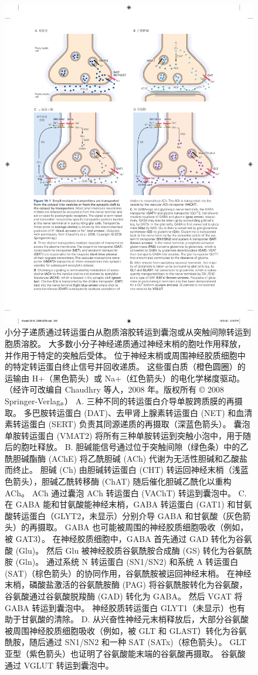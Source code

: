 \begin{figure}[htbp]
	\centering
	\includegraphics[width=0.95\linewidth]{chap16/fig_16_1}
	\caption{小分子递质通过转运蛋白从胞质溶胶转运到囊泡或从突触间隙转运到胞质溶胶。 大多数小分子神经递质通过神经末梢的胞吐作用释放，并作用于特定的突触后受体。 位于神经末梢或周围神经胶质细胞中的特定转运蛋白终止信号并回收递质。 这些蛋白质（橙色圆圈）的运输由 H+（黑色箭头）或 Na+（红色箭头）的电化学梯度驱动。 （经许可改编自 Chaudhry 等人，2008 年。版权所有 © 2008 Springer-Verlag。） A. 三种不同的转运蛋白介导单胺跨质膜的再摄取。 多巴胺转运蛋白 (DAT)、去甲肾上腺素转运蛋白 (NET) 和血清素转运蛋白 (SERT) 负责其同源递质的再摄取（深蓝色箭头）。 囊泡单胺转运蛋白 (VMAT2) 将所有三种单胺转运到突触小泡中，用于随后的胞吐释放。 B. 胆碱能信号通过位于突触间隙（绿色条）中的乙酰胆碱酯酶 (AChE) 将乙酰胆碱 (ACh) 代谢为无活性胆碱和乙酸盐而终止。 胆碱 (Ch) 由胆碱转运蛋白 (CHT) 转运回神经末梢（浅蓝色箭头），胆碱乙酰转移酶 (ChAT) 随后催化胆碱乙酰化以重构 ACh。 ACh 通过囊泡 ACh 转运蛋白 (VAChT) 转运到囊泡中。 C. 在 GABA 能和甘氨酸能神经末梢，GABA 转运蛋白 (GAT1) 和甘氨酸转运蛋白（GLYT2，未显示）分别介导 GABA 和甘氨酸（灰色箭头）的再摄取。 GABA 也可能被周围的神经胶质细胞吸收（例如，被 GAT3）。 在神经胶质细胞中，GABA 首先通过 GAD 转化为谷氨酸 (Glu)。 然后 Glu 被神经胶质谷氨酰胺合成酶 (GS) 转化为谷氨酰胺 (Gln)。 通过系统 N 转运蛋白 (SN1/SN2) 和系统 A 转运蛋白 (SAT)（棕色箭头）的协同作用，谷氨酰胺被运回神经末梢。 在神经末梢，磷酸盐激活的谷氨酰胺酶 (PAG) 将谷氨酰胺转化为谷氨酸，谷氨酸通过谷氨酸脱羧酶 (GAD) 转化为 GABA。 然后 VGAT 将 GABA 转运到囊泡中。 神经胶质转运蛋白 GLYT1（未显示）也有助于甘氨酸的清除。 D. 从兴奋性神经元末梢释放后，大部分谷氨酸被周围神经胶质细胞吸收（例如，被 GLT 和 GLAST）转化为谷氨酰胺，随后通过 SN1/SN2 和一种 SAT (SATx)（棕色箭头）。 GLT 亚型（紫色箭头）也证明了谷氨酸能末端的谷氨酸再摄取。 谷氨酸通过 VGLUT 转运到囊泡中。}

\end{figure}

